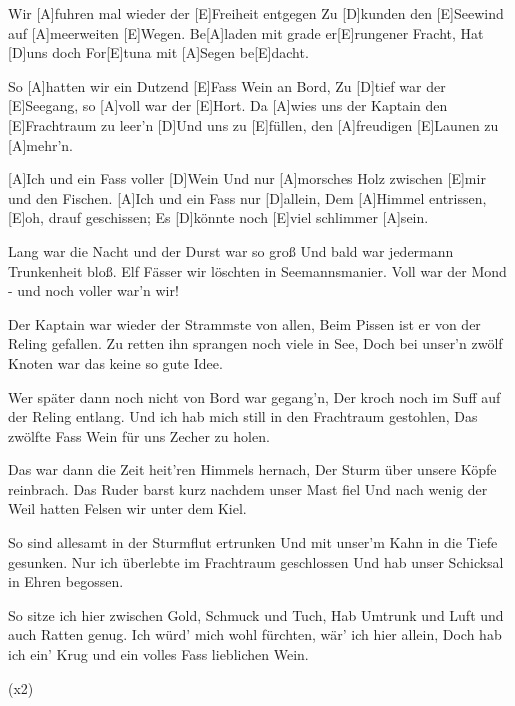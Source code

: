 

\begin{guitar}
	Wir [A]fuhren mal wieder der [E]Freiheit entgegen
	Zu [D]kunden den [E]Seewind auf [A]meerweiten [E]Wegen.
	Be[A]laden mit grade er[E]rungener Fracht,
	Hat [D]uns doch For[E]tuna mit [A]Segen be[E]dacht.
	
	So [A]hatten wir ein Dutzend [E]Fass Wein an Bord,
	Zu [D]tief war der [E]Seegang, so [A]voll war der [E]Hort.
	Da [A]wies uns der Kaptain den [E]Frachtraum zu leer'n
	[D]Und uns zu [E]füllen, den [A]freudigen [E]Launen zu [A]mehr'n.
	
	[A]Ich und ein Fass voller [D]Wein
	Und nur [A]morsches Holz zwischen [E]mir und den Fischen.
	[A]Ich und ein Fass nur [D]allein,
	Dem [A]Himmel entrissen, [E]oh, drauf geschissen;
	Es [D]könnte noch [E]viel schlimmer [A]sein.
	
	Lang war die Nacht und der Durst war so groß
	Und bald war jedermann Trunkenheit bloß.
	Elf Fässer wir löschten in Seemannsmanier.
	Voll war der Mond - und noch voller war'n wir!
	
	Der Kaptain war wieder der Strammste von allen,
	Beim Pissen ist er von der Reling gefallen.
	Zu retten ihn sprangen noch viele in See,
	Doch bei unser'n zwölf Knoten war das keine so gute Idee.
	
	 
	
	\pagebreak
	
	Wer später dann noch nicht von Bord war gegang'n,
	Der kroch noch im Suff auf der Reling entlang.
	Und ich hab mich still in den Frachtraum gestohlen,
	Das zwölfte Fass Wein für uns Zecher zu holen.
	
	Das war dann die Zeit heit'ren Himmels hernach,
	Der Sturm über unsere Köpfe reinbrach.
	Das Ruder barst kurz nachdem unser Mast fiel
	Und nach wenig der Weil hatten Felsen wir unter dem Kiel.
	
	 
	
	So sind allesamt in der Sturmflut ertrunken
	Und mit unser'm Kahn in die Tiefe gesunken.
	Nur ich überlebte im Frachtraum geschlossen
	Und hab unser Schicksal in Ehren begossen.
	
	So sitze ich hier zwischen Gold, Schmuck und Tuch,
	Hab Umtrunk und Luft und auch Ratten genug.
	Ich würd' mich wohl fürchten, wär' ich hier allein,
	Doch hab ich ein' Krug und ein volles Fass lieblichen Wein.
	
	  (x2)
\end{guitar}

